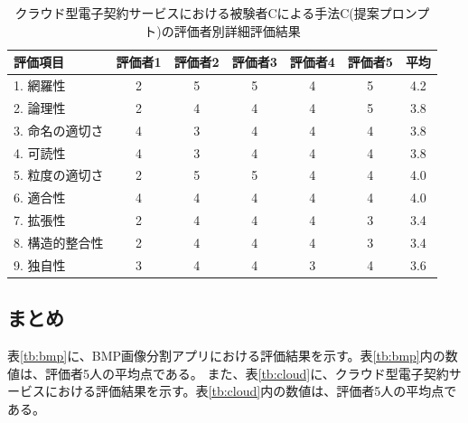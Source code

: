\begin{table}[tp]
  \caption{クラウド型電子契約サービスにおける被験者Cによる手法C(提案プロンプト)の評価者別詳細評価結果}
  \label{tb:cloud_detailed_evaluation_results_C2}
  \centering
  \begin{tabular}{|l|c|c|c|c|c|c|}
    \hline
    \textbf{評価項目} & \textbf{評価者1} & \textbf{評価者2} & \textbf{評価者3} & \textbf{評価者4} & \textbf{評価者5} & \textbf{平均} \\
    \hline\hline
    1. 網羅性 & 2 & 5 & 5 & 4 & 5 & 4.2 \\
    \hline
    2. 論理性 & 2 & 4 & 4 & 4 & 5 & 3.8 \\
    \hline
    3. 命名の適切さ & 4 & 3 & 4 & 4 & 4 & 3.8 \\
    \hline
    4. 可読性 & 4 & 3 & 4 & 4 & 4 & 3.8 \\
    \hline
    5. 粒度の適切さ & 2 & 5 & 5 & 4 & 4 & 4.0 \\
    \hline
    6. 適合性 & 4 & 4 & 4 & 4 & 4 & 4.0 \\
    \hline
    7. 拡張性 & 2 & 4 & 4 & 4 & 3 & 3.4 \\
    \hline
    8. 構造的整合性 & 2 & 4 & 4 & 4 & 3 & 3.4 \\
    \hline
    9. 独自性 & 3 & 4 & 4 & 3 & 4 & 3.6 \\
    \hline
  \end{tabular}
\end{table}


\subsection{まとめ}


表\ref{tb:bmp}に、BMP画像分割アプリにおける評価結果を示す。表\ref{tb:bmp}内の数値は、評価者5人の平均点である。
また、表\ref{tb:cloud}に、クラウド型電子契約サービスにおける評価結果を示す。表\ref{tb:cloud}内の数値は、評価者5人の平均点である。


